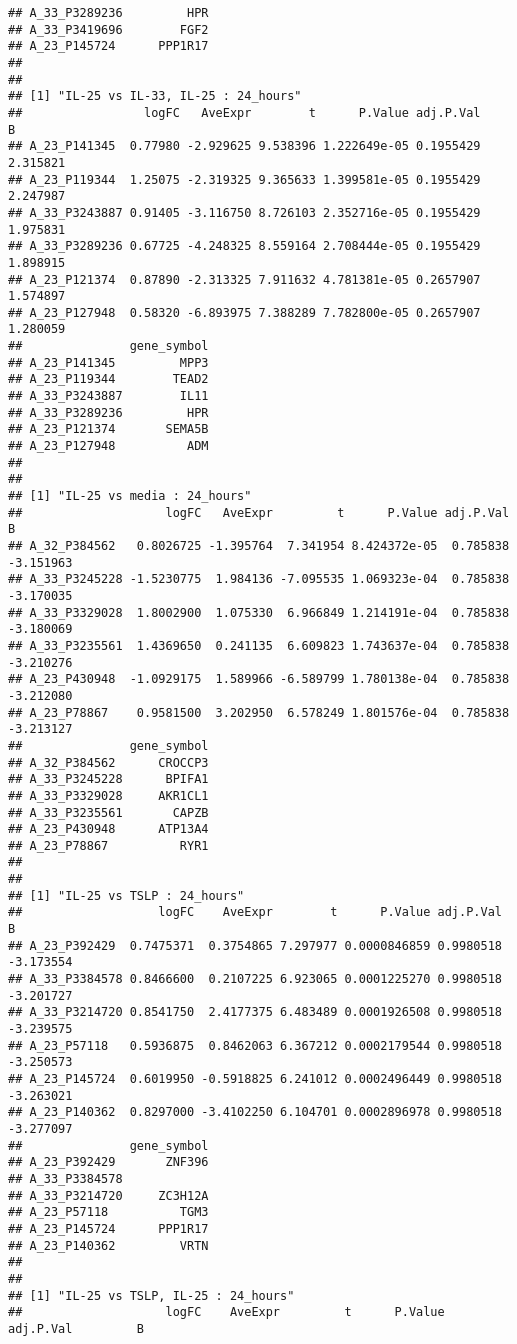 \documentclass[
]{article}
\begin{document}
\begin{verbatim}
## A_33_P3289236         HPR
## A_33_P3419696        FGF2
## A_23_P145724      PPP1R17
## 
## 
## [1] "IL-25 vs IL-33, IL-25 : 24_hours"
##                 logFC   AveExpr        t      P.Value adj.P.Val        B
## A_23_P141345  0.77980 -2.929625 9.538396 1.222649e-05 0.1955429 2.315821
## A_23_P119344  1.25075 -2.319325 9.365633 1.399581e-05 0.1955429 2.247987
## A_33_P3243887 0.91405 -3.116750 8.726103 2.352716e-05 0.1955429 1.975831
## A_33_P3289236 0.67725 -4.248325 8.559164 2.708444e-05 0.1955429 1.898915
## A_23_P121374  0.87890 -2.313325 7.911632 4.781381e-05 0.2657907 1.574897
## A_23_P127948  0.58320 -6.893975 7.388289 7.782800e-05 0.2657907 1.280059
##               gene_symbol
## A_23_P141345         MPP3
## A_23_P119344        TEAD2
## A_33_P3243887        IL11
## A_33_P3289236         HPR
## A_23_P121374       SEMA5B
## A_23_P127948          ADM
## 
## 
## [1] "IL-25 vs media : 24_hours"
##                    logFC   AveExpr         t      P.Value adj.P.Val         B
## A_32_P384562   0.8026725 -1.395764  7.341954 8.424372e-05  0.785838 -3.151963
## A_33_P3245228 -1.5230775  1.984136 -7.095535 1.069323e-04  0.785838 -3.170035
## A_33_P3329028  1.8002900  1.075330  6.966849 1.214191e-04  0.785838 -3.180069
## A_33_P3235561  1.4369650  0.241135  6.609823 1.743637e-04  0.785838 -3.210276
## A_23_P430948  -1.0929175  1.589966 -6.589799 1.780138e-04  0.785838 -3.212080
## A_23_P78867    0.9581500  3.202950  6.578249 1.801576e-04  0.785838 -3.213127
##               gene_symbol
## A_32_P384562      CROCCP3
## A_33_P3245228      BPIFA1
## A_33_P3329028     AKR1CL1
## A_33_P3235561       CAPZB
## A_23_P430948      ATP13A4
## A_23_P78867          RYR1
## 
## 
## [1] "IL-25 vs TSLP : 24_hours"
##                   logFC    AveExpr        t      P.Value adj.P.Val         B
## A_23_P392429  0.7475371  0.3754865 7.297977 0.0000846859 0.9980518 -3.173554
## A_33_P3384578 0.8466600  0.2107225 6.923065 0.0001225270 0.9980518 -3.201727
## A_33_P3214720 0.8541750  2.4177375 6.483489 0.0001926508 0.9980518 -3.239575
## A_23_P57118   0.5936875  0.8462063 6.367212 0.0002179544 0.9980518 -3.250573
## A_23_P145724  0.6019950 -0.5918825 6.241012 0.0002496449 0.9980518 -3.263021
## A_23_P140362  0.8297000 -3.4102250 6.104701 0.0002896978 0.9980518 -3.277097
##               gene_symbol
## A_23_P392429       ZNF396
## A_33_P3384578            
## A_33_P3214720     ZC3H12A
## A_23_P57118          TGM3
## A_23_P145724      PPP1R17
## A_23_P140362         VRTN
## 
## 
## [1] "IL-25 vs TSLP, IL-25 : 24_hours"
##                    logFC    AveExpr         t      P.Value adj.P.Val         B

\end{verbatim}
\end{document}
